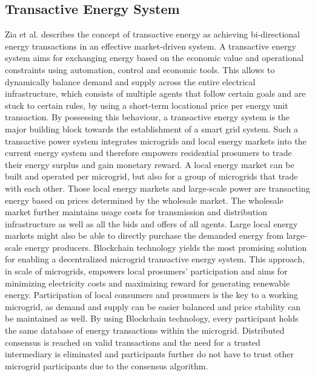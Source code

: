 \documentclass[runningheads]{llncs}
\begin{document}
\subsection{Transactive Energy System}
Zia et al. \cite{zia_microgrid_te} describes the concept of transactive energy as achieving bi-directional energy transactions in an effective market-driven system. A transactive energy system aims for exchanging energy based on the economic value and operational constraints using automation, control and economic tools. This allows to dynamically balance demand and supply across the entire electrical infrastructure, which consists of multiple agents that follow certain goals and are stuck to certain rules, by using a short-term locational price per energy unit transaction. By possessing this behaviour, a transactive energy system is the major building block towards the establishment of a smart grid system. \newline
Such a transactive power system integrates microgrids and local energy markets into the current energy system and therefore empowers residential prosumers to trade their energy surplus and gain monetary reward. A local energy market can be built and operated per microgrid, but also for a group of microgrids that trade with each other. Those local energy markets and large-scale power are transacting energy based on prices determined by the wholesale market. The wholesale market further maintains usage costs for transmission and distribution infrastructure as well as all the bids and offers of all agents. Large local energy markets might also be able to directly purchase the demanded energy from large-scale energy producers. \cite{zia_microgrid_te}
Blockchain technology yields the most promising solution for enabling a decentralized microgrid transactive energy system. This approach, in scale of microgrids, empowers local prosumers' participation and aims for minimizing electricity costs and maximizing reward for generating renewable energy. Participation of local consumers and prosumers is the key to a working microgrid, as demand and supply can be easier balanced and price stability can be maintained as well. By using Blockchain technology, every participant holds the same database of energy transactions within the microgrid. Distributed consensus is reached on valid transactions and the need for a trusted intermediary is eliminated and participants further do not have to trust other microgrid participants due to the consensus algorithm.
\end{document}
